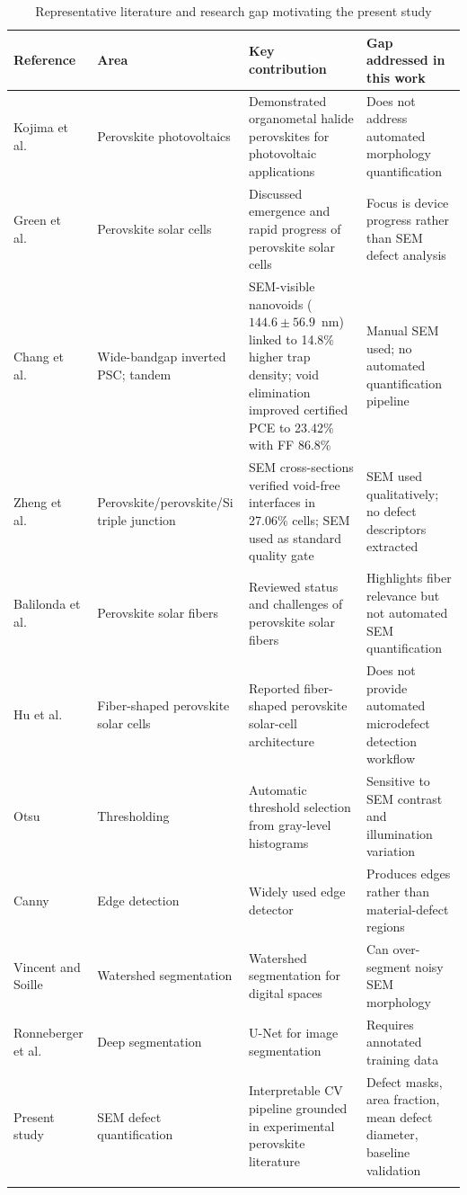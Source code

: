 \documentclass[pdflatex,sn-mathphys-num,iicol]{sn-jnl}
\theoremstyle{thmstyleone}
\theoremstyle{thmstyletwo}
\theoremstyle{thmstylethree}
\begin{document}
\begin{table}[t]
\caption{Representative literature and research gap motivating the present study}
\label{tab:literature_review}
\begin{tabular}{@{}p{2.8cm}p{3.0cm}p{4.6cm}p{4.8cm}@{}}
\toprule
Reference & Area & Key contribution & Gap addressed in this work \\
\midrule
Kojima et al.\ \cite{kojima2009}
  & Perovskite photovoltaics
  & Demonstrated organometal halide perovskites for photovoltaic applications
  & Does not address automated morphology quantification \\[4pt]
Green et al.\ \cite{green2014}
  & Perovskite solar cells
  & Discussed emergence and rapid progress of perovskite solar cells
  & Focus is device progress rather than SEM defect analysis \\[4pt]
Chang et al.\ \cite{chang2026}
  & Wide-bandgap inverted PSC; tandem
  & SEM-visible nanovoids ($144.6 \pm 56.9$~nm) linked to 14.8\% higher
    trap density; void elimination improved certified PCE to 23.42\%
    with FF 86.8\%
  & Manual SEM used; no automated quantification pipeline \\[4pt]
Zheng et al.\ \cite{zheng2025}
  & Perovskite/perovskite/Si triple junction
  & SEM cross-sections verified void-free interfaces in 27.06\% cells;
    SEM used as standard quality gate
  & SEM used qualitatively; no defect descriptors extracted \\[4pt]
Balilonda et al.\ \cite{balilonda2019}
  & Perovskite solar fibers
  & Reviewed status and challenges of perovskite solar fibers
  & Highlights fiber relevance but not automated SEM quantification \\[4pt]
Hu et al.\ \cite{hu2016}
  & Fiber-shaped perovskite solar cells
  & Reported fiber-shaped perovskite solar-cell architecture
  & Does not provide automated microdefect detection workflow \\[4pt]
Otsu \cite{otsu1979}
  & Thresholding
  & Automatic threshold selection from gray-level histograms
  & Sensitive to SEM contrast and illumination variation \\[4pt]
Canny \cite{canny1986}
  & Edge detection
  & Widely used edge detector
  & Produces edges rather than material-defect regions \\[4pt]
Vincent and Soille \cite{vincent1991}
  & Watershed segmentation
  & Watershed segmentation for digital spaces
  & Can over-segment noisy SEM morphology \\[4pt]
Ronneberger et al.\ \cite{ronneberger2015}
  & Deep segmentation
  & U-Net for image segmentation
  & Requires annotated training data \\[4pt]
Present study
  & SEM defect quantification
  & Interpretable CV pipeline grounded in experimental perovskite literature
  & Defect masks, area fraction, mean defect diameter, baseline validation \\
\botrule
\end{tabular}
\end{table}
\end{document}

